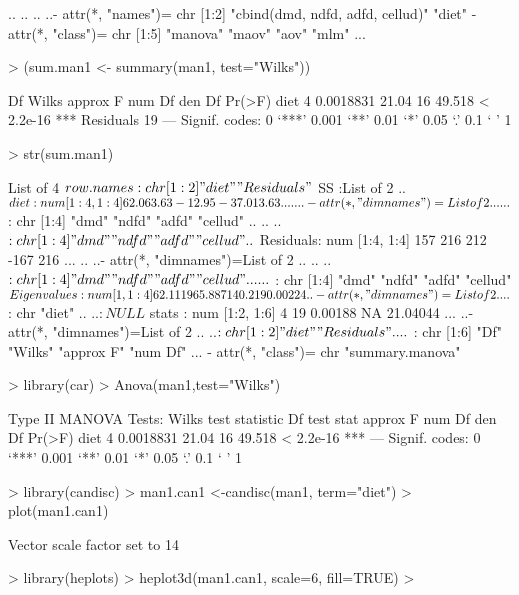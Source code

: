 \documentclass{article}
\begin{document}
\begin{Schunk}
\begin{Soutput}
  .. .. .. ..- attr(*, "names")= chr [1:2] "cbind(dmd, ndfd, adfd, cellud)" "diet"
 - attr(*, "class")= chr [1:5] "manova" "maov" "aov" "mlm" ...
\end{Soutput}
\begin{Sinput}
> (sum.man1 <- summary(man1, test="Wilks"))
\end{Sinput}
\begin{Soutput}
          Df     Wilks approx F num Df den Df    Pr(>F)    
diet       4 0.0018831    21.04     16 49.518 < 2.2e-16 ***
Residuals 19                                               
---
Signif. codes:  0 ‘***’ 0.001 ‘**’ 0.01 ‘*’ 0.05 ‘.’ 0.1 ‘ ’ 1
\end{Soutput}
\begin{Sinput}
> str(sum.man1)
\end{Sinput}
\begin{Soutput}
List of 4
 $ row.names  : chr [1:2] "diet" "Residuals"
 $ SS         :List of 2
  ..$ diet     : num [1:4, 1:4] 62.06 3.63 -12.95 -37.01 3.63 ...
  .. ..- attr(*, "dimnames")=List of 2
  .. .. ..$ : chr [1:4] "dmd" "ndfd" "adfd" "cellud"
  .. .. ..$ : chr [1:4] "dmd" "ndfd" "adfd" "cellud"
  ..$ Residuals: num [1:4, 1:4] 157 216 212 -167 216 ...
  .. ..- attr(*, "dimnames")=List of 2
  .. .. ..$ : chr [1:4] "dmd" "ndfd" "adfd" "cellud"
  .. .. ..$ : chr [1:4] "dmd" "ndfd" "adfd" "cellud"
 $ Eigenvalues: num [1, 1:4] 62.11196 5.88714 0.219 0.00224
  ..- attr(*, "dimnames")=List of 2
  .. ..$ : chr "diet"
  .. ..$ : NULL
 $ stats      : num [1:2, 1:6] 4 19 0.00188 NA 21.04044 ...
  ..- attr(*, "dimnames")=List of 2
  .. ..$ : chr [1:2] "diet" "Residuals"
  .. ..$ : chr [1:6] "Df" "Wilks" "approx F" "num Df" ...
 - attr(*, "class")= chr "summary.manova"
\end{Soutput}
\end{Schunk}

\begin{Schunk}
\begin{Sinput}
> library(car)
> Anova(man1,test="Wilks")
\end{Sinput}
\begin{Soutput}
Type II MANOVA Tests: Wilks test statistic
     Df test stat approx F num Df den Df    Pr(>F)    
diet  4 0.0018831    21.04     16 49.518 < 2.2e-16 ***
---
Signif. codes:  0 ‘***’ 0.001 ‘**’ 0.01 ‘*’ 0.05 ‘.’ 0.1 ‘ ’ 1
\end{Soutput}
\begin{Sinput}
> library(candisc)
> man1.can1 <-candisc(man1, term="diet")
> plot(man1.can1)
\end{Sinput}
\begin{Soutput}
Vector scale factor set to  14 
\end{Soutput}
\begin{Sinput}
> library(heplots)
> heplot3d(man1.can1, scale=6, fill=TRUE)
> 
\end{Sinput}
\end{Schunk}
\end{document}

